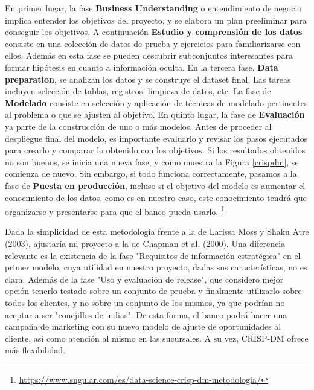 \documentclass{article}
\begin{document}
En primer lugar, la fase \textbf{Business Understanding} o entendimiento de negocio implica entender los objetivos del proyecto, y se elabora un plan preeliminar para conseguir los objetivos. A continuación \textbf{Estudio y comprensión de los datos} consiste en una colección de datos de prueba y ejercicios para familiarizarse con ellos. Además en esta fase se pueden descubrir subconjuntos interesantes para formar hipótesis en cuanto a información oculta. En la tercera fase, \textbf{Data preparation}, se analizan los datos y se construye el dataset final. Las tareas incluyen selección de tablas, registros, limpieza de datos, etc. La fase de \textbf{Modelado} consiste en selección y aplicación de técnicas de modelado pertinentes al problema o que se ajusten al objetivo. En quinto lugar, la fase de \textbf{Evaluación} ya parte de la construcción de uno o más modelos. Antes de proceder al despliegue final del modelo, es importante evaluarlo y revisar los pasos ejecutados para crearlo y comparar lo obtenido con los objetivos. Si los resultados obtenidos no son buenos, se inicia una nueva fase, y como muestra la Figura \ref{crispdm}, se comienza de nuevo. Sin embargo, si todo funciona correctamente, pasamos a la fase de \textbf{Puesta en producción}, incluso si el objetivo del modelo es aumentar el conocimiento de los datos, como es en nuestro caso, este conocimiento tendrá que organizarse y presentarse para que el banco pueda usarlo. \footnote{\url{https://www.sngular.com/es/data-science-crisp-dm-metodologia/}}

Dada la simplicidad de esta metodología frente a la de Larissa Moss y Shaku Atre (2003), ajustaría mi proyecto a la de Chapman et al. (2000). Una diferencia relevante es la existencia de la fase "Requisitos de información estratégica" en el primer modelo, cuya utilidad en nuestro proyecto, dadas sus características, no es clara. Además de la fase "Uso y evaluación de release", que considero mejor opción tenerlo testado sobre un conjunto de prueba y finalmente utilizarlo sobre todos los clientes, y no sobre un conjunto de los mismos, ya que podrían no aceptar a ser "conejillos de indias". De esta forma, el banco podrá hacer una campaña de marketing con su nuevo modelo de ajuste de oportunidades al cliente, así como atención al mismo en las sucursales. A su vez, CRISP-DM ofrece más flexibilidad.
\end{document}
